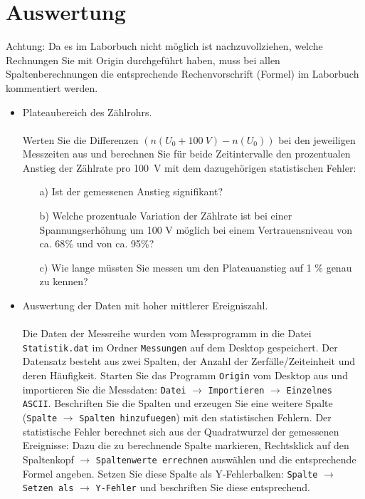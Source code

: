 \documentclass[landscape,twocolumn]{article}
\begin{document}
\section{Auswertung}
Achtung: Da es im Laborbuch nicht m\"{o}glich ist nachzuvollziehen, welche Rechnungen Sie mit Origin durchgef\"{u}hrt haben, muss bei allen Spaltenberechnungen die entsprechende Rechenvorschrift (Formel) im Laborbuch kommentiert werden.
\begin{itemize}
  \item Plateaubereich des Z\"{a}hlrohrs.\\
  \\Werten Sie die Differenzen $(n(U_0+100~V) - n(U_0))$  bei den jeweiligen Messzeiten aus und
  berechnen Sie f\"{u}r beide Zeitintervalle den prozentualen Anstieg der Z\"{a}hlrate pro 100~V mit dem dazugeh\"{o}rigen
  statistischen Fehler:
  \begin{itemize}
    \item [a)]	Ist der gemessenen Anstieg signifikant?
    \item [b)]	Welche prozentuale Variation der Z\"{a}hlrate ist bei einer Spannungserh\"{o}hung um 100 V m\"{o}glich bei einem Vertrauensniveau von ca. 68$\%$ und von ca. 95$\%$?
    \item [c)]	Wie lange m\"{u}ssten Sie messen um den Plateauanstieg auf 1 $\%$ genau zu kennen?
  \end{itemize}
  \item  Auswertung der Daten mit hoher mittlerer Ereigniszahl.\\
  \\Die Daten der Messreihe wurden vom Messprogramm in die Datei  \verb"Statistik.dat" im Ordner  \verb"Messungen"  auf dem Desktop gespeichert. Der Datensatz besteht aus zwei Spalten, der Anzahl der Zerf\"{a}lle/Zeiteinheit und deren H\"{a}ufigkeit.
    Starten Sie das Programm \verb"Origin" vom Desktop aus und importieren Sie die Messdaten:
\verb"Datei" $\rightarrow$ \verb"Importieren" $\rightarrow$ \verb"Einzelnes ASCII". Beschriften Sie die Spalten und erzeugen Sie eine weitere Spalte (\verb"Spalte" $\rightarrow$ \verb"Spalten hinzufuegen") mit den statistischen Fehlern. Der statistische Fehler berechnet sich aus der Quadratwurzel der gemessenen Ereignisse: Dazu die zu berechnende Spalte markieren, Rechtsklick auf den Spaltenkopf $\rightarrow$ \verb"Spaltenwerte errechnen" ausw\"{a}hlen und die entsprechende Formel angeben. Setzen Sie diese Spalte als  Y-Fehlerbalken: \verb"Spalte" $\rightarrow$ \verb"Setzen als" $\rightarrow$ \verb"Y-Fehler" und beschriften Sie diese entsprechend.


\end{itemize}
\end{document}

